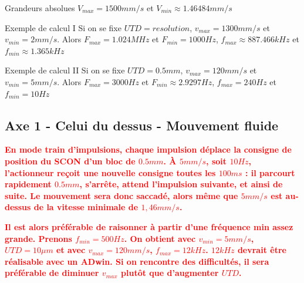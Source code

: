 \documentclass[a4paper,11pt]{beamer}
\begin{document}
\begin{frame}
\begin{alertblock}{Grandeurs absolues}
$V_{max} = 1500mm/s$ et $V_{min} \approx 1.46484mm/s$
\end{alertblock}

\begin{exampleblock}{Exemple de calcul I}
Si on se fixe $UTD = resolution$, $v_{max} = 1300mm/s$ et $v_{min} = 2mm/s$. Alors
$F_{max} = 1.024MHz$ et $F_{min} = 1000Hz$,
$f_{max} \approx 887.466kHz$ et $f_{min} \approx 1.365kHz$
\end{exampleblock}

\begin{exampleblock}{Exemple de calcul II}
Si on se fixe $UTD = 0.5mm$, $v_{max} = 120mm/s$ et $v_{min} = 5mm/s$. Alors $F_{max} = 3000Hz$ et $F_{min} \approx 2.9297Hz$, $f_{max} = 240Hz$ et $f_{min} = 10Hz$
\end{exampleblock}
\end{frame}

\subsection{Axe 1 - Celui du dessus - Mouvement fluide}
\begin{frame}
\justifying
\textbf{\textcolor{red}{
En mode train d'impulsions, chaque impulsion déplace la consigne de position du SCON d'un bloc de $0.5 mm$. À $5 mm/s$, soit $10 Hz$, l'actionneur reçoit une nouvelle consigne toutes les $100 ms$ : il parcourt rapidement $0.5 mm$, s'arrête, attend l'impulsion suivante, et ainsi de suite. Le mouvement sera donc saccadé, alors même que $5 mm/s$ est au-dessus de la vitesse minimale de $1,46mm/s$.}}
\vspace{0.5cm}

\textbf{\textcolor{red}{
Il est alors préférable de raisonner à partir d'une fréquence min assez grande. Prenons $f_{min} = 500Hz$. On obtient avec $v_{min}=5mm/s$, $UTD=10\mu m$ et avec $v_{max}=120mm/s$, $f_{max}=12kHz$. $12kHz$ devrait être réalisable avec un ADwin. Si on rencontre des difficultés, il sera préférable de diminuer $v_{max}$ plutôt que d'augmenter $UTD$.}}
\end{frame}
\end{document}
